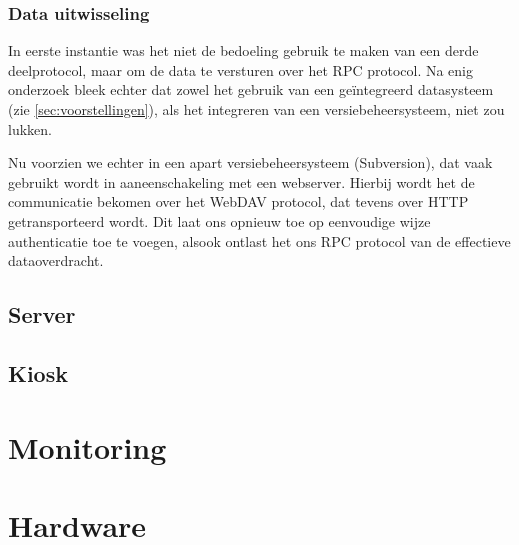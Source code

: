 \subsection{Data uitwisseling}

In eerste instantie was het niet de bedoeling gebruik te maken van een derde deelprotocol, maar om de data te versturen over het RPC protocol. Na enig onderzoek bleek echter dat zowel het gebruik van een geïntegreerd datasysteem (zie \ref{sec:voorstellingen}), als het integreren van een versiebeheersysteem, niet zou lukken.

Nu voorzien we echter in een apart versiebeheersysteem (Subversion), dat vaak gebruikt wordt in aaneenschakeling met een webserver. Hierbij wordt het de communicatie bekomen over het WebDAV protocol, dat tevens over HTTP getransporteerd wordt. Dit laat ons opnieuw toe op eenvoudige wijze authenticatie toe te voegen, alsook ontlast het ons RPC protocol van de effectieve dataoverdracht.

\section{Server}
\label{sec:server}

\section{Kiosk}
\label{sec:kiosk}


%
%

\chapter{Monitoring}
\label{chap:monitoring}


%
%

\chapter{Hardware}
\label{chap:hardware}
